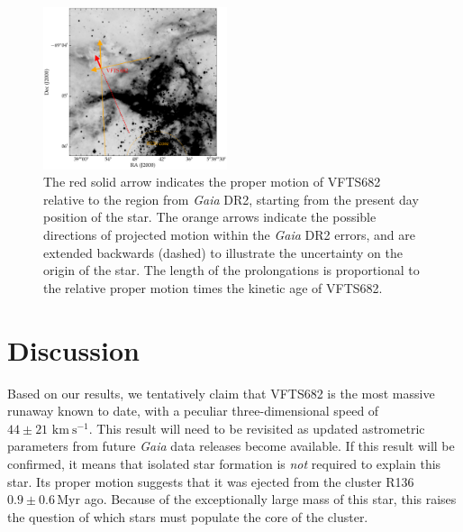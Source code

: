 \documentclass[a4paper,fleqn,usenatbib]{mnras}
\newcommand{\todo}[1]{{\large $\blacksquare$~\textbf{\color{red}[#1]}}~$\blacksquare$}
\newcommand{\kms}{{\,\mathrm{km\ s^{-1}}}}
\begin{document}
\begin{figure}%
  \centering
  \includegraphics[width=0.48\textwidth]{./figures/main_plot_good_gaia_only}  
  \caption{The red solid arrow indicates the proper motion of VFTS682
    relative to the region from \emph{Gaia} DR2, starting from the present day position of
    the star. The orange arrows indicate the possible
    directions of projected motion within the \emph{Gaia} DR2 errors, and are extended
    backwards (dashed) to illustrate the uncertainty on the origin of the
    star. The length of the prolongations is proportional to the relative proper motion
    times the kinetic age of VFTS682. %
  }
  
  \label{fig:main}
\end{figure}


\section{Discussion}
\label{sec:discussion}

Based on our results, we tentatively claim that VFTS682 is the most massive
runaway known to date, with a peculiar three-dimensional speed of
$44\pm21\,\kms$. This result will need to be revisited as updated
astrometric parameters from future \emph{Gaia} data releases become
available. If this result will be confirmed, it means that isolated star formation is
\emph{not} required to explain this star. Its proper motion suggests that it was ejected from the cluster R136
$0.9\pm0.6$\,Myr ago. Because of the exceptionally large mass
of this star, this raises the question of which stars must populate
the core of the cluster.
\end{document}
